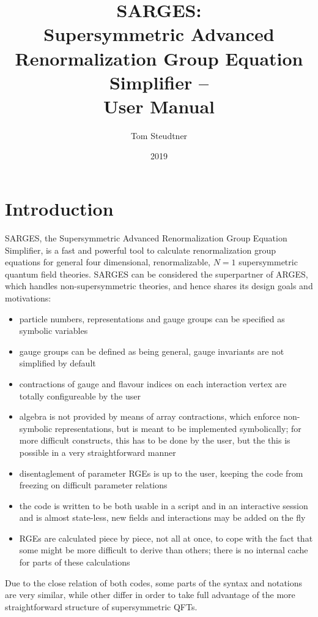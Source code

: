 \documentclass{scrartcl}
\title{SARGES: \\ Supersymmetric Advanced Renormalization Group Equation Simplifier -- \\ User Manual}
\date{2019}
\author{Tom Steudtner}
\begin{document}
\begin{titlepage}
\maketitle
\end{titlepage}
\newpage
\tableofcontents
\thispagestyle{empty}
\newpage
\section{Introduction}
SARGES, the Supersymmetric Advanced Renormalization Group Equation Simplifier, is a fast and powerful tool to calculate renormalization group equations for general four dimensional, renormalizable, $N=1$ supersymmetric quantum field theories. SARGES can be considered the superpartner of ARGES, which handles non-supersymmetric theories, and hence shares its design goals and motivations:
\begin{itemize}
\item particle numbers, representations and gauge groups can be specified as symbolic variables
\item gauge groups can be defined as being general, gauge invariants are not simplified by default
\item contractions of gauge and flavour indices on each interaction vertex are totally configureable by the user
\item algebra is not provided by means of array contractions, which enforce non-symbolic representations, but is meant to be implemented symbolically; for more difficult constructs, this has to be done by the user, but the this is possible in a very straightforward manner 
\item disentaglement of parameter RGEs is up to the user, keeping the code from freezing on difficult parameter relations
\item the code is written to be both usable in a script and in an interactive session and is almost state-less, new fields and interactions may be added on the fly
\item RGEs are calculated piece by piece, not all at once, to cope with the fact that some might be more difficult to derive than others; there is no internal cache for parts of these calculations
\end{itemize}
Due to the close relation of both codes, some parts of the syntax and notations are very similar, while other differ in order to take full advantage of the more straightforward structure of supersymmetric QFTs.
\end{document}
